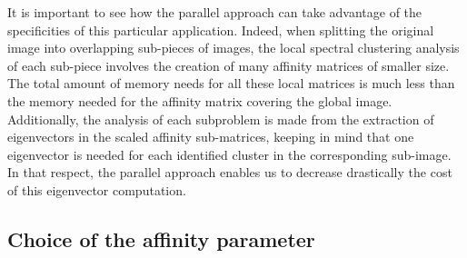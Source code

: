 \documentclass[]{svmult}
\begin{document}
It is important to see how the parallel approach can take advantage of the
specificities of this particular application. Indeed, when splitting the
original image into overlapping sub-pieces of images, the local spectral
clustering analysis of each sub-piece involves the creation of many affinity
matrices of smaller size. The total amount of memory needs for all these
local matrices is much less than the memory needed for the affinity matrix
covering the global image.
Additionally, the analysis of each subproblem is made from the extraction of
eigenvectors in the scaled affinity sub-matrices, keeping in mind that one
eigenvector is needed for each identified cluster in the corresponding
sub-image. 
In that respect, the parallel approach enables us to decrease
drastically the cost of this eigenvector computation.


\vspace{-0.5cm}
\subsection{Choice of the affinity parameter}
\vspace{-0.3cm}
\end{document}
